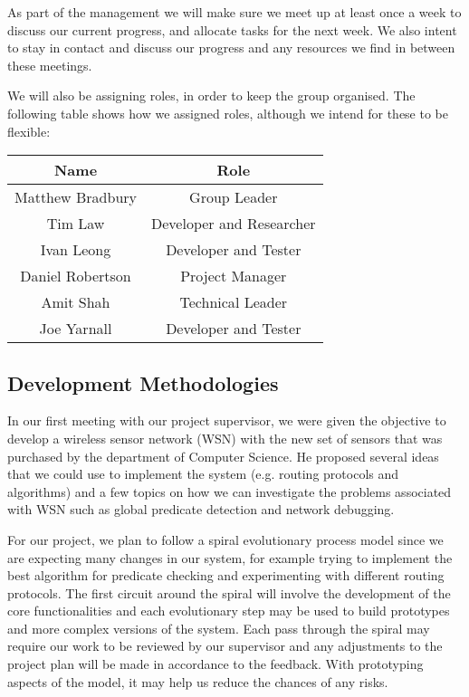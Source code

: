 \documentclass[a4paper]{article}
\begin{document}
As part of the management we will make sure we meet up at least once a week to
discuss our current progress, and allocate tasks for the next week. We also
intent to stay in contact and discuss our progress and any resources we find in
between these meetings.

We will also be assigning roles, in order to keep the group organised. The
following table shows how we assigned roles, although we intend for these to be
flexible:

\begin{table}[H]
\centering
	\begin{tabular}{| c | c |}
		\hline
		Name & Role\\
		\hline
		Matthew Bradbury & Group Leader\\
		Tim Law & Developer and Researcher\\
		Ivan Leong & Developer and Tester\\
		Daniel Robertson & Project Manager\\
		Amit Shah & Technical Leader\\
		Joe Yarnall & Developer and Tester\\
		\hline
	\end{tabular}
\end{table}



\subsection{Development Methodologies}
In our first meeting with our project supervisor, we were given the objective to
develop a wireless sensor network (WSN) with the new set of sensors that was
purchased by the department of Computer Science. He proposed several ideas that
we could use to implement the system (e.g. routing protocols and algorithms) and
a few topics on how we can investigate the problems associated with WSN such as
global predicate detection and network debugging. 

For our project, we plan to follow a spiral evolutionary process model since we
are expecting many changes in our system, for example trying to implement the
best algorithm for predicate checking and experimenting with different routing
protocols. The first circuit around the spiral will involve the development of
the core functionalities and each evolutionary step may be used to build
prototypes and more complex versions of the system. Each pass through the spiral
may require our work to be reviewed by our supervisor and any adjustments to the
project plan will be made in accordance to the feedback. With prototyping
aspects of the model, it may help us reduce the chances of any risks.
\end{document}
